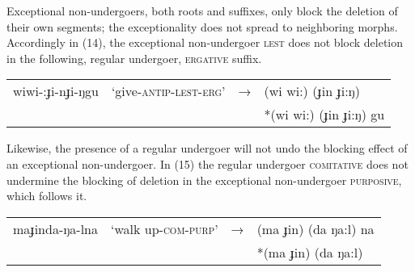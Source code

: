 \documentclass[output=paper,
modfonts
]{LSP/langsci}
\begin{document}
Exceptional non-undergoers, both roots and suffixes, only block the deletion of their own segments; the exceptionality does not spread to neighboring morphs. Accordingly in (14), the exceptional non-undergoer \textsc{lest} does not block deletion in the following, regular undergoer, \textsc{ergative} suffix. 

\ea
\begin{tabular}[t]{@{}llll}
wiwi-:ɟi-nɟi-ŋgu &`give-\textsc{antip-lest-erg}' & → & (wi wi:) (ɟin ɟi:ŋ)\\
&&& *(wi wi:) (ɟin ɟi:ŋ) gu  \\
\end{tabular}
\z 

\noindent Likewise, the presence of a regular undergoer will not undo the blocking effect of an exceptional non-undergoer. In (15) the regular undergoer \textsc{comitative} does not undermine the blocking of deletion in the exceptional non-undergoer \textsc{purposive}, which follows it.

\ea
\begin{tabular}[t]{@{}llll}
maɟinda-ŋa-lna & `walk up-\textsc{com-purp}'& → & (ma ɟin) (da ŋa:l) na\\
&&& *(ma ɟin) (da ŋa:l) \\

\end{tabular}
\z
\end{document}
